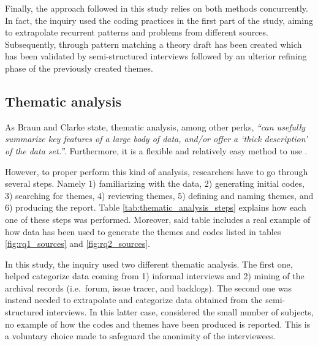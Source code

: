 Finally, the approach followed in this study relies on both methods concurrently. In fact, the inquiry used the coding practices in the first part of the study, aiming to extrapolate recurrent patterns and problems from different sources. Subsequently, through pattern matching a theory draft has been created which has been validated by semi-structured interviews followed by an ulterior refining phase of the previously created themes.

\subsection{Thematic analysis} \label{sec:thematic-analysis}
As Braun and Clarke \cite{thematic_analysis} state, thematic analysis, among other perks, \textit{``can usefully summarize key features of a large body of data, and/or offer a ‘thick description’ of the data set.''}. Furthermore, it is a flexible and relatively easy method to use \cite{thematic_analysis}.

However, to proper perform this kind of analysis, researchers have to go through several steps. Namely 1) familiarizing with the data, 2) generating initial codes, 3) searching for themes, 4) reviewing themes, 5) defining and naming themes, and 6) producing the report. Table \ref{tab:thematic_analysis_steps} explains how each one of these steps was performed. Moreover, said table includes a real example of how data has been used to generate the themes and codes listed in tables \ref{fig:rq1_sources} and \ref{fig:rq2_sources}.

In this study, the inquiry used two different thematic analysis. The first one, helped categorize data coming from 1) informal interviews and 2) mining of the archival records (i.e.\ forum, issue tracer, and backlogs). The second one was instead needed to extrapolate and categorize data obtained from the semi-structured interviews. In this latter case, considered the small number of subjects, no example of how the codes and themes have been produced is reported. This is a voluntary choice made to safeguard the anonimity of the interviewees.

